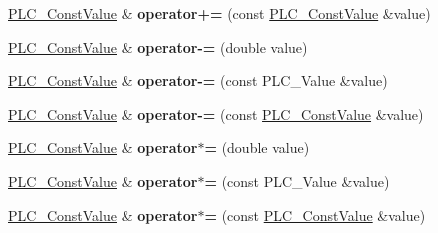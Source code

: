 \begin{DoxyCompactItemize}
\item 
\hypertarget{classns3_1_1PLC__ConstValue_a0e07e4509079110c3dfbf52f1a6273a0}{\hyperlink{classns3_1_1PLC__ConstValue}{\-P\-L\-C\-\_\-\-Const\-Value} \& {\bfseries operator+=} (const \hyperlink{classns3_1_1PLC__ConstValue}{\-P\-L\-C\-\_\-\-Const\-Value} \&value)}\label{classns3_1_1PLC__ConstValue_a0e07e4509079110c3dfbf52f1a6273a0}

\item 
\hypertarget{classns3_1_1PLC__ConstValue_a7a568e79eb91c137247491ef4b727ff4}{\hyperlink{classns3_1_1PLC__ConstValue}{\-P\-L\-C\-\_\-\-Const\-Value} \& {\bfseries operator-\/=} (double value)}\label{classns3_1_1PLC__ConstValue_a7a568e79eb91c137247491ef4b727ff4}

\item 
\hypertarget{classns3_1_1PLC__ConstValue_ade6f076fcf0bae55d7135098ea028e58}{\hyperlink{classns3_1_1PLC__ConstValue}{\-P\-L\-C\-\_\-\-Const\-Value} \& {\bfseries operator-\/=} (const \-P\-L\-C\-\_\-\-Value \&value)}\label{classns3_1_1PLC__ConstValue_ade6f076fcf0bae55d7135098ea028e58}

\item 
\hypertarget{classns3_1_1PLC__ConstValue_a293e05b74a98eda2034823412b0a8f49}{\hyperlink{classns3_1_1PLC__ConstValue}{\-P\-L\-C\-\_\-\-Const\-Value} \& {\bfseries operator-\/=} (const \hyperlink{classns3_1_1PLC__ConstValue}{\-P\-L\-C\-\_\-\-Const\-Value} \&value)}\label{classns3_1_1PLC__ConstValue_a293e05b74a98eda2034823412b0a8f49}

\item 
\hypertarget{classns3_1_1PLC__ConstValue_abb48ce8dd5446cdfb1b532eb22971501}{\hyperlink{classns3_1_1PLC__ConstValue}{\-P\-L\-C\-\_\-\-Const\-Value} \& {\bfseries operator$\ast$=} (double value)}\label{classns3_1_1PLC__ConstValue_abb48ce8dd5446cdfb1b532eb22971501}

\item 
\hypertarget{classns3_1_1PLC__ConstValue_a71e746adccffd323521efd52c1be809d}{\hyperlink{classns3_1_1PLC__ConstValue}{\-P\-L\-C\-\_\-\-Const\-Value} \& {\bfseries operator$\ast$=} (const \-P\-L\-C\-\_\-\-Value \&value)}\label{classns3_1_1PLC__ConstValue_a71e746adccffd323521efd52c1be809d}

\item 
\hypertarget{classns3_1_1PLC__ConstValue_a3c032684c93747891370bd953ae0b08f}{\hyperlink{classns3_1_1PLC__ConstValue}{\-P\-L\-C\-\_\-\-Const\-Value} \& {\bfseries operator$\ast$=} (const \hyperlink{classns3_1_1PLC__ConstValue}{\-P\-L\-C\-\_\-\-Const\-Value} \&value)}\label{classns3_1_1PLC__ConstValue_a3c032684c93747891370bd953ae0b08f}


\end{DoxyCompactItemize}
